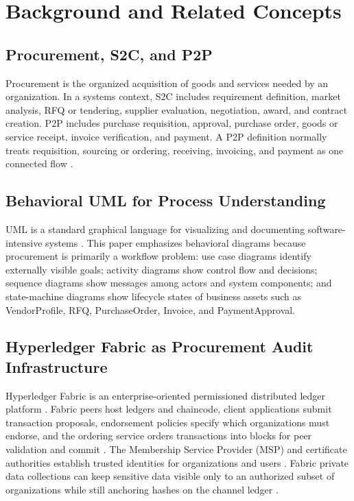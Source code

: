 \documentclass[conference]{IEEEtran}
\begin{document}
\section{Background and Related Concepts}
\subsection{Procurement, S2C, and P2P}
Procurement is the organized acquisition of goods and services needed by an organization. In a systems context, S2C includes requirement definition, market analysis, RFQ or tendering, supplier evaluation, negotiation, award, and contract creation. P2P includes purchase requisition, approval, purchase order, goods or service receipt, invoice verification, and payment. A P2P definition normally treats requisition, sourcing or ordering, receiving, invoicing, and payment as one connected flow \cite{ibm_p2p,sap_p2p}.

\subsection{Behavioral UML for Process Understanding}
UML is a standard graphical language for visualizing and documenting software-intensive systems \cite{omg_uml}. This paper emphasizes behavioral diagrams because procurement is primarily a workflow problem: use case diagrams identify externally visible goals; activity diagrams show control flow and decisions; sequence diagrams show messages among actors and system components; and state-machine diagrams show lifecycle states of business assets such as VendorProfile, RFQ, PurchaseOrder, Invoice, and PaymentApproval.

\subsection{Hyperledger Fabric as Procurement Audit Infrastructure}
Hyperledger Fabric is an enterprise-oriented permissioned distributed ledger platform \cite{fabric_main}. Fabric peers host ledgers and chaincode, client applications submit transaction proposals, endorsement policies specify which organizations must endorse, and the ordering service orders transactions into blocks for peer validation and commit \cite{fabric_peers,fabric_ordering}. The Membership Service Provider (MSP) and certificate authorities establish trusted identities for organizations and users \cite{fabric_msp,fabric_security}. Fabric private data collections can keep sensitive data visible only to an authorized subset of organizations while still anchoring hashes on the channel ledger \cite{fabric_private}.
\end{document}
